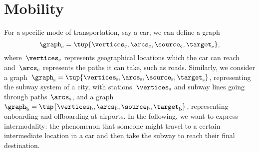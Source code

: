 
\section{Mobility}

For a specific mode of transportation, say a car, we can define a graph
\begin{equation*}
    \graph_\mathrm{c}=\tup{\vertices_\mathrm{c},\arcs_\mathrm{c},\source_\mathrm{c},\target_\mathrm{c}},
\end{equation*}
where~$\vertices_\mathrm{c}$ represents geographical locations which the car can reach and~$\arcs_\mathrm{c}$ represents the paths it can take, such as roads.
Similarly, we consider a graph~$\graph_\mathrm{s}=\tup{\vertices_\mathrm{s},\arcs_\mathrm{s},\source_\mathrm{s},\target_\mathrm{s}}$, representing the subway system of a city, with stations~$\vertices_\mathrm{s}$ and subway lines going through paths~$\arcs_\mathrm{s}$, and a graph $\graph_\mathrm{b}=\tup{\vertices_\mathrm{b},\arcs_\mathrm{b},\source_\mathrm{b},\target_\mathrm{b}}$, representing onboarding and offboarding at airports.
In the following, we want to express intermodality: the phenomenon that someone might travel to a certain intermediate location in a car and then take the subway to reach their final destination.

